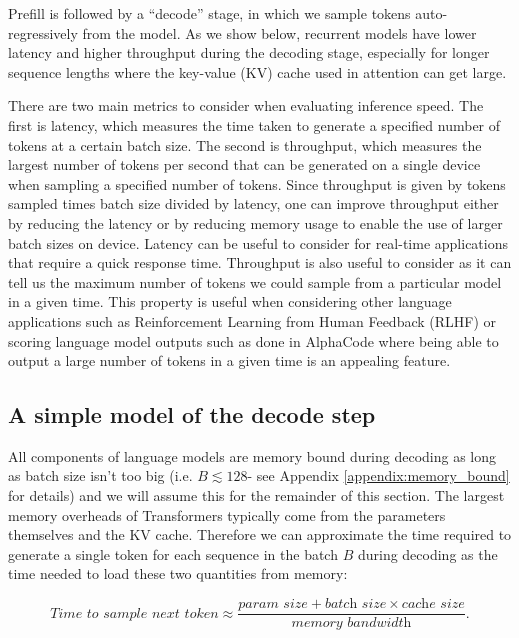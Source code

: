 Prefill is followed by a ``decode'' stage, in which we sample tokens auto-regressively from the model. As we show below, recurrent models have lower latency and higher throughput during the decoding stage, especially for longer sequence lengths where the key-value (KV) cache used in attention can get large.

There are two main metrics to consider when evaluating inference speed. The first is latency, which measures the time taken to generate a specified number of tokens at a certain batch size. The second is throughput, which measures the largest number of tokens per second that can be generated on a single device when sampling a specified number of tokens. Since throughput is given by tokens sampled times batch size divided by latency, one can improve throughput either by reducing the latency or by reducing memory usage to enable the use of larger batch sizes on device. Latency can be useful to consider for real-time applications that require a quick response time. Throughput is also useful to consider as it can tell us the maximum number of tokens we could sample from a particular model in a given time. This property is useful when considering other language applications such as Reinforcement Learning from Human Feedback (RLHF) or scoring language model outputs such as done in AlphaCode \citep{li2022competition} where being able to output a large number of tokens in a given time is an appealing feature.

\subsection{A simple model of the decode step}

All components of language models are memory bound during decoding as long as batch size isn't too big (i.e. $B \lesssim 128$- see Appendix \ref{appendix:memory_bound} for details) and we will assume this for the remainder of this section. The largest memory overheads of Transformers typically come from the parameters themselves and the KV cache. Therefore we can approximate the time required to generate a single token for each sequence in the batch $B$ during decoding as the time needed to load these two quantities from memory:

\begin{equation}
    \textit{Time to sample next token} \approx \frac{\textit{param size} + \textit{batch size} \times \textit{cache size}}{\textit{memory bandwidth}}.
\end{equation}

